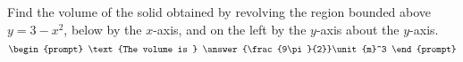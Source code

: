 \documentclass{ximera}
\author{Gregory Hartman \and Matthew Carr}
\begin{document}
\begin{exercise}






Find the volume of the solid obtained by revolving the region bounded above $y=3-x^2$, below by the $x$-axis, and on the left by the $y$-axis about the $y$-axis.
\[
\begin{prompt}
\text{The volume is } \answer{\frac{9\pi}{2}}\unit{m}^3
\end{prompt}
\]




\end{exercise}
\end{document}
